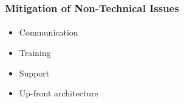 \begin{frame}
  \frametitle{Mitigation of Non-Technical Issues}
  \framesubtitle{}
  \begin{itemize}
    \item<1-> Communication

    \item<2-> Training

    \item<3-> Support

    \item<4->Up-front architecture


  \end{itemize}
\end{frame}
